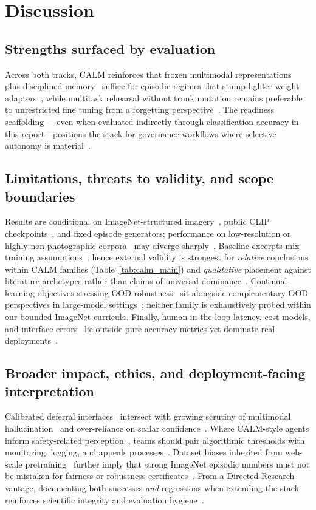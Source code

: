 \documentclass[12pt,a4paper]{report}
\begin{document}
\section{Discussion}

\subsection*{Strengths surfaced by evaluation}
Across both tracks, CALM reinforces that frozen multimodal representations~\cite{r1} plus disciplined memory~\cite{r3,r24} suffice for episodic regimes that stump lighter-weight adapters~\cite{r4}, while multitask rehearsal without trunk mutation remains preferable to unrestricted fine tuning from a forgetting perspective~\cite{r6,r7}. The readiness scaffolding~\cite{r5,r10}---even when evaluated indirectly through classification accuracy in this report---positions the stack for governance workflows where selective autonomy is material~\cite{r24,r26}.

\subsection*{Limitations, threats to validity, and scope boundaries}
Results are conditional on ImageNet-structured imagery~\cite{r2}, public CLIP checkpoints~\cite{r1}, and fixed episode generators; performance on low-resolution or highly non-photographic corpora~\cite{r28,r29,r30} may diverge sharply~\cite{r27}. Baseline excerpts mix training assumptions~\cite{r16,r19}; hence external validity is strongest for \emph{relative} conclusions within CALM families (Table~\ref{tab:calm_main}) and \emph{qualitative} placement against literature archetypes rather than claims of universal dominance~\cite{r19}. Continual-learning objectives stressing OOD robustness~\cite{r20} sit alongside complementary OOD perspectives in large-model settings~\cite{r22}; neither family is exhaustively probed within our bounded ImageNet curricula. Finally, human-in-the-loop latency, cost models, and interface errors~\cite{r24} lie outside pure accuracy metrics yet dominate real deployments~\cite{r25}.

\subsection*{Broader impact, ethics, and deployment-facing interpretation}
Calibrated deferral interfaces~\cite{r10,r25} intersect with growing scrutiny of multimodal hallucination~\cite{r23} and over-reliance on scalar confidence~\cite{r26}. Where CALM-style agents inform safety-related perception~\cite{r25}, teams should pair algorithmic thresholds with monitoring, logging, and appeals processes~\cite{r24}. Dataset biases inherited from web-scale pretraining~\cite{r2,r27} further imply that strong ImageNet episodic numbers must not be mistaken for fairness or robustness certificates~\cite{r23,r30}. From a Directed Research vantage, documenting both successes \emph{and} regressions when extending the stack~\cite{r31,r32} reinforces scientific integrity and evaluation hygiene~\cite{r19}.
\end{document}

